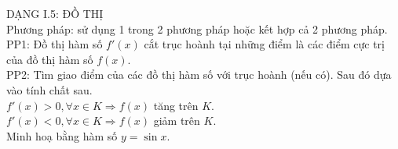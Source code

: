 \begin{ex}
{		DẠNG I.5: ĐỒ THỊ\\
		Phương pháp: sử dụng 1 trong 2 phương pháp hoặc kết hợp cả 2 phương pháp.\\
		PP1: Đồ thị hàm số $f'(x)$ cắt trục hoành tại những điểm là các điểm cực trị của đồ thị hàm số $f(x)$.\\
		PP2: Tìm giao điểm của các đồ thị hàm số với trục hoành (nếu có). Sau đó dựa vào tính chất sau.\\
		$f'(x)>0,\forall x\in K \Rightarrow f(x)$ tăng trên $K$.\\
		$f'(x)<0,\forall x\in K \Rightarrow f(x)$ giảm trên $K$.\\
		Minh hoạ bằng hàm số $y=\sin x$.
		}
\end{ex}